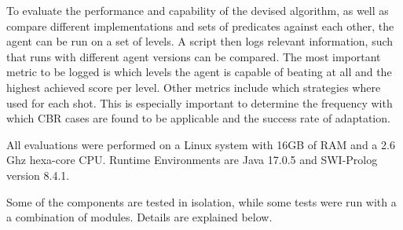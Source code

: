To evaluate the performance and capability of the devised algorithm, as well as compare different implementations and sets of predicates against each other, the agent can be run on a set of levels.
A script then logs relevant information, such that runs with different agent versions can be compared.
The most important metric to be logged is which levels the agent is capable of beating at all and the highest achieved score per level.
Other metrics include which strategies where used for each shot.
This is especially important to determine the frequency with which \acs{CBR} cases are found to be applicable and the success rate of adaptation.

All evaluations were performed on a Linux system with 16GB of RAM and a 2.6 Ghz hexa-core CPU. Runtime Environments are Java 17.0.5 and SWI-Prolog version 8.4.1. 

Some of the components are tested in isolation, while some tests were run with a a combination of modules. Details are explained below.